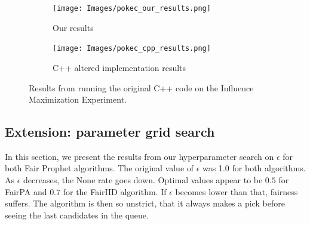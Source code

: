 \begin{figure}[H]
  \begin{minipage}{\linewidth}
      \centering
      \begin{minipage}{0.45\linewidth}
          \begin{figure}[H]
              \texttt{[image: Images/pokec\_our\_results.png]}
              \centering \par Our results
          \end{figure}
      \end{minipage}
      \begin{minipage}{0.45\linewidth}
          \begin{figure}[H]
              \texttt{[image: Images/pokec\_cpp\_results.png]}
              \centering \par C++ altered implementation results
          \end{figure}
      \end{minipage}
  \end{minipage}
  \caption{Results from running the original C++ code on the Influence Maximization Experiment.}
  \label{fig:secretary_experimentd_results}
\end{figure}


\subsection{Extension: parameter grid search}
\label{sec:parameter_extension}

In this section, we present the results from our hyperparameter search on $\epsilon$ for both Fair Prophet algorithms. The original value of $\epsilon$ was 1.0 for both algorithms. As $\epsilon$ decreases, the None rate goes down. Optimal values appear to be $0.5$ for FairPA and $0.7$ for the FairIID algorithm. If $\epsilon$ becomes lower than that, fairness suffers. The algorithm is then so unstrict, that it always makes a pick before seeing the last candidates in the queue.


